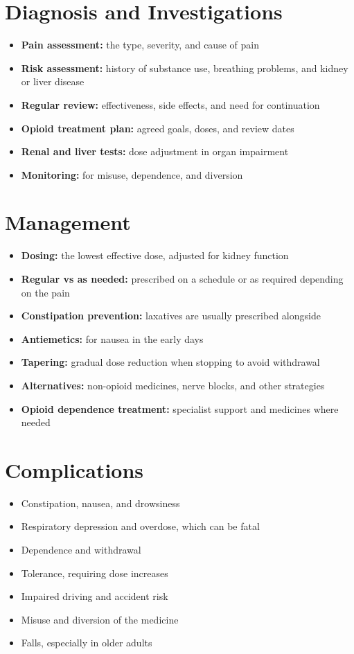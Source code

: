 \section*{Diagnosis and Investigations}
\begin{itemize}
    \item \textbf{Pain assessment:} the type, severity, and cause of pain
    \item \textbf{Risk assessment:} history of substance use, breathing problems, and kidney or liver disease
    \item \textbf{Regular review:} effectiveness, side effects, and need for continuation
    \item \textbf{Opioid treatment plan:} agreed goals, doses, and review dates
    \item \textbf{Renal and liver tests:} dose adjustment in organ impairment
    \item \textbf{Monitoring:} for misuse, dependence, and diversion
\end{itemize}

\section*{Management}
\begin{itemize}
    \item \textbf{Dosing:} the lowest effective dose, adjusted for kidney function
    \item \textbf{Regular vs as needed:} prescribed on a schedule or as required depending on the pain
    \item \textbf{Constipation prevention:} laxatives are usually prescribed alongside
    \item \textbf{Antiemetics:} for nausea in the early days
    \item \textbf{Tapering:} gradual dose reduction when stopping to avoid withdrawal
    \item \textbf{Alternatives:} non-opioid medicines, nerve blocks, and other strategies
    \item \textbf{Opioid dependence treatment:} specialist support and medicines where needed
\end{itemize}

\section*{Complications}
\begin{itemize}
    \item Constipation, nausea, and drowsiness
    \item Respiratory depression and overdose, which can be fatal
    \item Dependence and withdrawal
    \item Tolerance, requiring dose increases
    \item Impaired driving and accident risk
    \item Misuse and diversion of the medicine
    \item Falls, especially in older adults
\end{itemize}

